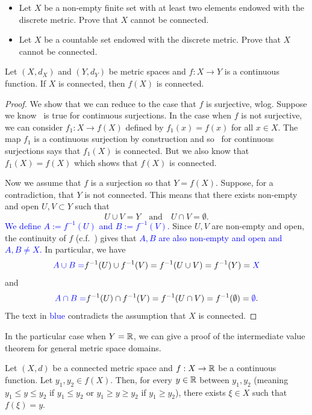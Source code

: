 \begin{ex}
	\begin{itemize}
		\item Let $X$ be a non-empty finite set with at least two elements endowed with the discrete metric. Prove that $X$ cannot be connected.
		\item Let $X$ be a countable set endowed with the discrete metric. Prove that $X$ cannot be connected.
	\end{itemize}
\end{ex}
\begin{prop}
	\label{prop:cts_im_connect}
	Let $(X,d_X)$ and $(Y,d_Y)$ be metric spaces and $f:X\to Y$ is a continuous function. If $X$ is connected, then $f(X)$ is connected.
\end{prop}
\begin{proof}
	We show that we can reduce to the case that $f$ is surjective, wlog. Suppose we know~ is true for continuous surjections. In the case when $f$ is not surjective, we can consider $f_1: X \to f(X)$ defined by $f_1(x) = f(x)$ for all $x\in X$. The map $f_1$ is a continuous surjection by construction and so~ for continuous surjections says that $f_1(X)$ is connected. But we also know that $f_1(X) = f(X)$ which shows that $f(X)$ is connected.
	
	Now we assume that $f$ is a surjection so that $Y = f(X)$. Suppose, for a contradiction, that $Y$ is not connected. This means that there exists non-empty and open $U,V\subset Y$ such that
	\[
	U\cup V = Y\quad\text{and}\quad U\cap V = \emptyset.
	\]
	\textcolor{blue}{We define $A:= f^{-1}(U)$ and $B := f^{-1}(V)$.} Since $U,V$ are non-empty and open, the continuity of $f$ (c.f.~) gives that \textcolor{blue}{$A,B$ are also non-empty and open and $A,B\neq X$.} In particular, we have
	\[
	\textcolor{blue}{A \cup B = }f^{-1}(U)\cup f^{-1}(V) = f^{-1}(U\cup V) = f^{-1}(Y) = \textcolor{blue}{X}
	\]
	and
	\[
	\textcolor{blue}{A\cap B = }f^{-1}(U)\cap f^{-1}(V) = f^{-1}(U\cap V) = f^{-1}(\emptyset) = \textcolor{blue}{\emptyset}.
	\]
	The text in \textcolor{blue}{blue} contradicts the assumption that $X$ is connected.
\end{proof}
In the particular case when $Y = \mathbb{R}$, we can give a proof of the intermediate value theorem for general metric space domains.
\begin{thm}
	\label{thm:IVT}
	Let $(X,d)$ be a connected metric space and $f:X\to \mathbb{R}$ be a continuous function. Let $y_1,y_2\in f(X)$. Then, for every $y\in \mathbb{R}$ between $y_1,y_2$ (meaning $y_1\le y\le y_2$ if $y_1 \le y_2$ or $y_1 \ge y \ge y_2$ if $y_1 \ge y_2$), there exists $\xi \in X$ such that $f(\xi) = y$.
\end{thm}
